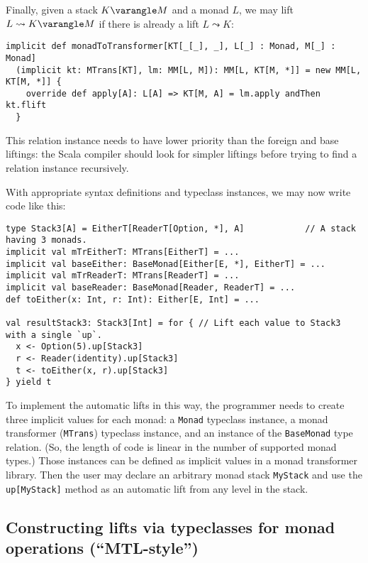 Finally, given a stack $K\varangle M$ and a monad $L$, we may lift
$L\leadsto K\varangle M$ if there is already a lift $L\leadsto K$:
\begin{lstlisting}
implicit def monadToTransformer[KT[_[_], _], L[_] : Monad, M[_] : Monad]
  (implicit kt: MTrans[KT], lm: MM[L, M]): MM[L, KT[M, *]] = new MM[L, KT[M, *]] {
    override def apply[A]: L[A] => KT[M, A] = lm.apply andThen kt.flift
  }
\end{lstlisting}
This relation instance needs to have lower priority than the foreign
and base liftings: the Scala compiler should look for simpler liftings
before trying to find a relation instance recursively.

With appropriate syntax definitions and typeclass instances, we may
now write code like this:
\begin{lstlisting}
type Stack3[A] = EitherT[ReaderT[Option, *], A]            // A stack having 3 monads.
implicit val mTrEitherT: MTrans[EitherT] = ...
implicit val baseEither: BaseMonad[Either[E, *], EitherT] = ...
implicit val mTrReaderT: MTrans[ReaderT] = ...
implicit val baseReader: BaseMonad[Reader, ReaderT] = ...
def toEither(x: Int, r: Int): Either[E, Int] = ...

val resultStack3: Stack3[Int] = for { // Lift each value to Stack3 with a single `up`. 
  x <- Option(5).up[Stack3]
  r <- Reader(identity).up[Stack3]
  t <- toEither(x, r).up[Stack3]
} yield t
\end{lstlisting}

To implement the automatic lifts in this way, the programmer needs
to create three implicit values for each monad: a \lstinline!Monad!
typeclass instance, a monad transformer (\lstinline!MTrans!) typeclass
instance, and an instance of the \lstinline!BaseMonad! type relation.
(So, the length of code is linear in the number of supported monad
types.) Those instances can be defined as implicit values in a monad
transformer library. Then the user may declare an arbitrary monad
stack \lstinline!MyStack! and use the \lstinline!up[MyStack]! method
as an automatic lift from any level in the stack.

\subsection{Constructing lifts via typeclasses for monad operations (\textsf{``}MTL-style\textsf{''})\label{subsec:Combining-monads-via-mtl-style}}

